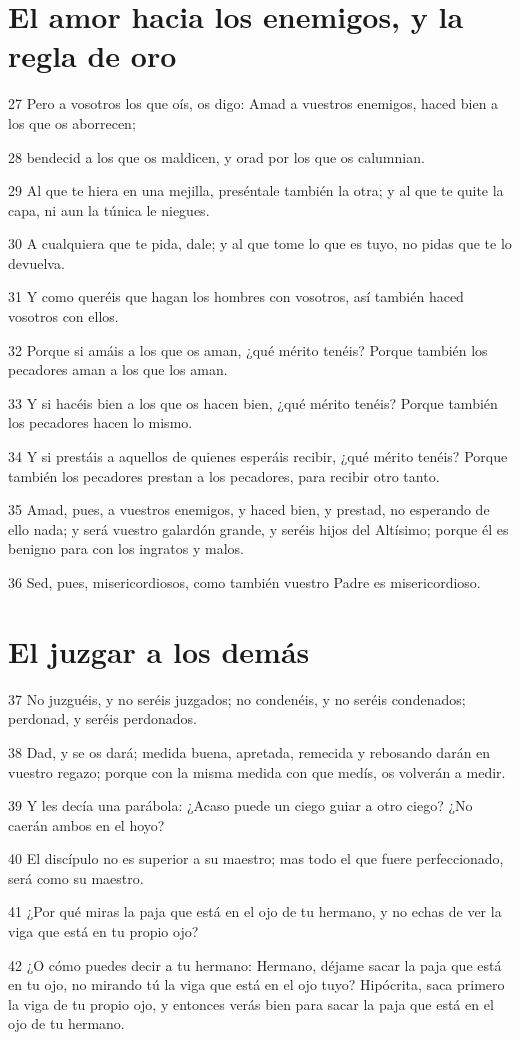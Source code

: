 \section*{El amor hacia los enemigos, y la regla de oro}

\par 27 Pero a vosotros los que oís, os digo: Amad a vuestros enemigos, haced bien a los que os aborrecen;
\par 28 bendecid a los que os maldicen, y orad por los que os calumnian.
\par 29 Al que te hiera en una mejilla, preséntale también la otra; y al que te quite la capa, ni aun la túnica le niegues.
\par 30 A cualquiera que te pida, dale; y al que tome lo que es tuyo, no pidas que te lo devuelva.
\par 31 Y como queréis que hagan los hombres con vosotros, así también haced vosotros con ellos.
\par 32 Porque si amáis a los que os aman, ¿qué mérito tenéis? Porque también los pecadores aman a los que los aman.
\par 33 Y si hacéis bien a los que os hacen bien, ¿qué mérito tenéis? Porque también los pecadores hacen lo mismo.
\par 34 Y si prestáis a aquellos de quienes esperáis recibir, ¿qué mérito tenéis? Porque también los pecadores prestan a los pecadores, para recibir otro tanto.
\par 35 Amad, pues, a vuestros enemigos, y haced bien, y prestad, no esperando de ello nada; y será vuestro galardón grande, y seréis hijos del Altísimo; porque él es benigno para con los ingratos y malos.
\par 36 Sed, pues, misericordiosos, como también vuestro Padre es misericordioso.

\section*{El juzgar a los demás}

\par 37 No juzguéis, y no seréis juzgados; no condenéis, y no seréis condenados; perdonad, y seréis perdonados.
\par 38 Dad, y se os dará; medida buena, apretada, remecida y rebosando darán en vuestro regazo; porque con la misma medida con que medís, os volverán a medir.
\par 39 Y les decía una parábola: ¿Acaso puede un ciego guiar a otro ciego? ¿No caerán ambos en el hoyo?
\par 40 El discípulo no es superior a su maestro; mas todo el que fuere perfeccionado, será como su maestro.
\par 41 ¿Por qué miras la paja que está en el ojo de tu hermano, y no echas de ver la viga que está en tu propio ojo?
\par 42 ¿O cómo puedes decir a tu hermano: Hermano, déjame sacar la paja que está en tu ojo, no mirando tú la viga que está en el ojo tuyo? Hipócrita, saca primero la viga de tu propio ojo, y entonces verás bien para sacar la paja que está en el ojo de tu hermano.

